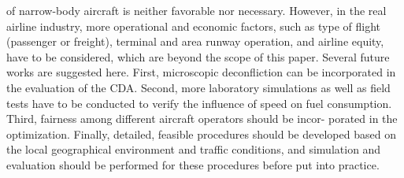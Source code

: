 \documentclass{aer1315-pretty}
\begin{document}
\begin{itemize}
of narrow-body aircraft is neither favorable nor necessary. However,
in the real airline industry, more operational and economic factors,
such as type of flight (passenger or freight), terminal and area runway
operation, and airline equity, have to be considered, which are beyond
the scope of this paper.
   Several future works are suggested here. First, microscopic
deconfliction can be incorporated in the evaluation of the CDA.
Second, more laboratory simulations as well as field tests have to be
conducted to verify the influence of speed on fuel consumption.
Third, fairness among different aircraft operators should be incor-
porated in the optimization. Finally, detailed, feasible procedures
should be developed based on the local geographical environment
and traffic conditions, and simulation and evaluation should be
performed for these procedures before put into practice.




\end{itemize}
\end{document}
